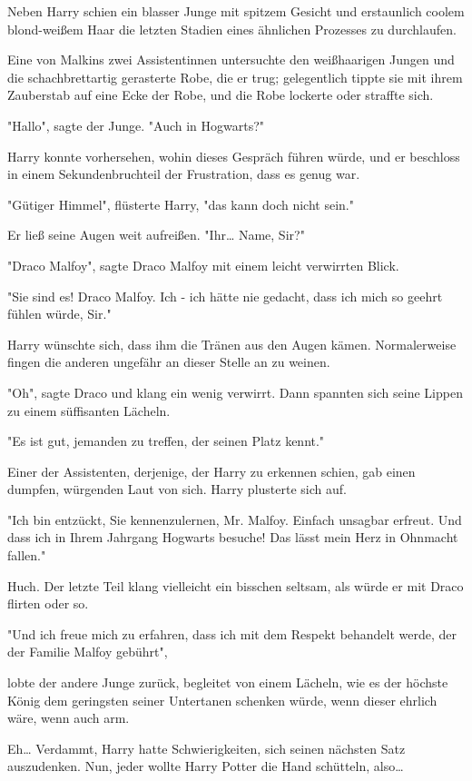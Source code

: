 {Neben Harry schien ein blasser Junge mit spitzem Gesicht und erstaunlich coolem blond-weißem Haar die letzten Stadien eines ähnlichen Prozesses zu durchlaufen.

Eine von Malkins zwei Assistentinnen untersuchte den weißhaarigen Jungen und die schachbrettartig gerasterte Robe, die er trug; gelegentlich tippte sie mit ihrem Zauberstab auf eine Ecke der Robe, und die Robe lockerte oder straffte sich.

"Hallo", sagte der Junge. "Auch in Hogwarts?"

Harry konnte vorhersehen, wohin dieses Gespräch führen würde, und er beschloss in einem Sekundenbruchteil der Frustration, dass es genug war.

"Gütiger Himmel", flüsterte Harry, "das kann doch nicht sein."

Er ließ seine Augen weit aufreißen. "Ihr… Name, Sir?"

"Draco Malfoy", sagte Draco Malfoy mit einem leicht verwirrten Blick.

"Sie sind es! Draco Malfoy. Ich - ich hätte nie gedacht, dass ich mich so geehrt fühlen würde, Sir."

Harry wünschte sich, dass ihm die Tränen aus den Augen kämen. Normalerweise fingen die anderen ungefähr an dieser Stelle an zu weinen.

"Oh", sagte Draco und klang ein wenig verwirrt. Dann spannten sich seine Lippen zu einem süffisanten Lächeln.

"Es ist gut, jemanden zu treffen, der seinen Platz kennt."

Einer der Assistenten, derjenige, der Harry zu erkennen schien, gab einen dumpfen, würgenden Laut von sich. Harry plusterte sich auf.

"Ich bin entzückt, Sie kennenzulernen, Mr. Malfoy. Einfach unsagbar erfreut. Und dass ich in Ihrem Jahrgang Hogwarts besuche! Das lässt mein Herz in Ohnmacht fallen."

Huch. Der letzte Teil klang vielleicht ein bisschen seltsam, als würde er mit Draco flirten oder so.

"Und ich freue mich zu erfahren, dass ich mit dem Respekt behandelt werde, der der Familie Malfoy gebührt",

lobte der andere Junge zurück, begleitet von einem Lächeln, wie es der höchste König dem geringsten seiner Untertanen schenken würde, wenn dieser ehrlich wäre, wenn auch arm.

Eh… Verdammt, Harry hatte Schwierigkeiten, sich seinen nächsten Satz auszudenken. Nun, jeder wollte Harry Potter die Hand schütteln, also…

}
